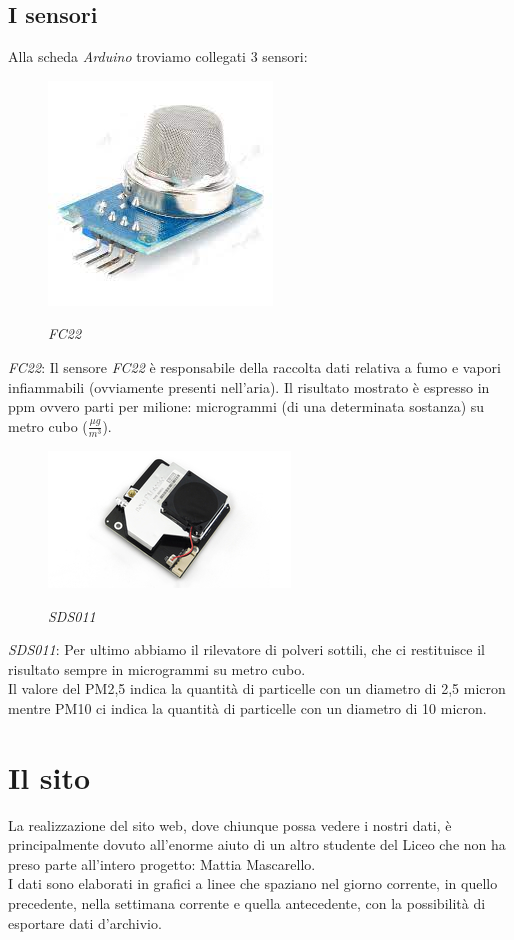 \documentclass{article}
\begin{document}
\subsection{I sensori}
Alla scheda \emph{Arduino} troviamo collegati 3 sensori:
\begin{figure}[h!]
\centering
\includegraphics[]{FC22.png}\\
\caption{\emph{FC22}}
\end{figure}
\emph{FC22}: Il sensore \emph{FC22} è responsabile della raccolta dati relativa a fumo e vapori infiammabili (ovviamente presenti nell’aria). Il risultato mostrato è espresso in ppm ovvero parti per milione: microgrammi (di una determinata sostanza) su metro cubo ($\frac{\mu g}{m^3}$).
\begin{figure}[h!]
\centering
\includegraphics[]{sds011.jpg}\\
\caption{\emph{SDS011}}
\end{figure}
\emph{SDS011}: Per ultimo abbiamo il rilevatore di polveri sottili, che ci restituisce il risultato sempre in microgrammi su metro cubo.\\
Il valore del PM2,5 indica la quantità di particelle con un diametro di 2,5 micron mentre PM10 ci indica la quantità di particelle con un diametro di 10 micron.
\section{Il sito}
La realizzazione del sito web, dove chiunque possa vedere i nostri dati, è principalmente dovuto all’enorme aiuto di un altro studente del Liceo che non ha preso parte all’intero progetto: Mattia Mascarello.\\
I dati sono elaborati in grafici a linee che spaziano nel giorno corrente, in quello precedente, nella settimana corrente e quella antecedente, con la possibilità di esportare dati d'archivio.\\
\end{document}
